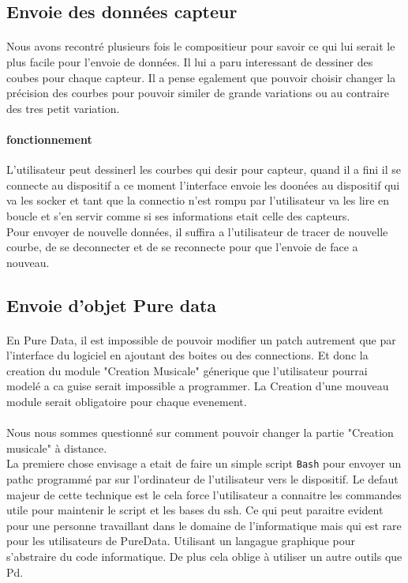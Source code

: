 \documentclass[a4paper, titlepage, oneside, 12pt]{article}%
\begin{document}
\subsection{Envoie des données capteur}
\paragraph{}
Nous avons recontré plusieurs fois le compositieur pour savoir ce qui lui serait le plus facile pour l'envoie de données. Il lui a paru interessant de dessiner des coubes pour chaque capteur. Il a pense egalement que pouvoir choisir changer la précision des courbes pour pouvoir similer de grande variations ou au contraire des tres petit variation.\\
\paragraph{fonctionnement}
L'utilisateur peut dessinerl les courbes qui desir pour capteur, quand il a fini il se connecte au dispositif a ce moment l'interface envoie les doonées au dispositif qui va les socker et tant que la connectio n'est rompu par l'utilisateur va les lire en boucle et s'en servir comme si ses informations etait celle des capteurs.\\
Pour envoyer de nouvelle données, il suffira a l'utilisateur de tracer de nouvelle courbe, de se deconnecter et de se reconnecte pour que l'envoie de face a nouveau.

\subsection{Envoie d'objet Pure data}
\paragraph{}
En Pure Data, il est impossible de pouvoir modifier un patch autrement que par l'interface du logiciel en ajoutant des boites ou des connections. Et donc la creation du module "Creation Musicale" génerique que l'utilisateur pourrai modelé a ca guise serait impossible a programmer. La Creation d'une mouveau module serait obligatoire pour chaque evenement.
\paragraph{}
Nous nous sommes questionné sur comment  pouvoir changer la partie "Creation musicale" à distance.\\
La premiere chose envisage a etait de faire un simple script \texttt{Bash} pour envoyer un pathc programmé par sur l'ordinateur de l'utilisateur vers le dispositif. Le defaut majeur de cette technique est le cela force l'utilisateur a connaitre les commandes utile pour maintenir le script et les bases du ssh. Ce qui peut paraitre evident pour une personne travaillant dans le domaine de l'informatique mais qui est rare pour les utilisateurs de PureData. Utilisant un langague graphique pour s'abstraire du code informatique. De plus cela  oblige à utiliser un autre outils que Pd.
\end{document}
